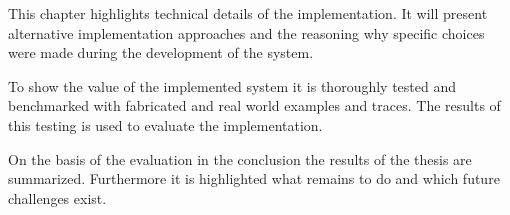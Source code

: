 \textbf{}

This chapter highlights technical details of the implementation.
It will present alternative implementation approaches and the reasoning why specific choices were made during the development of the system.

\textbf{}

To show the value of the implemented system it is thoroughly tested and benchmarked with fabricated and real world examples and traces.
The results of this testing is used to evaluate the implementation.

\textbf{}

On the basis of the evaluation in the conclusion the results of the thesis are summarized.
Furthermore it is highlighted what remains to do and which future challenges exist.



